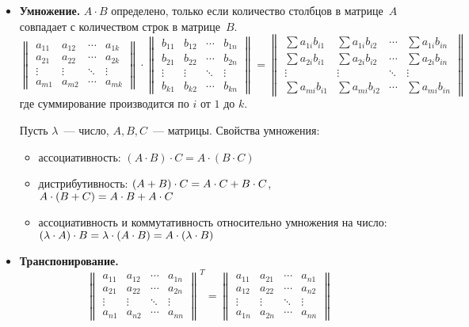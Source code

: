 \begin{itemize}
	\item\textbf{Умножение.} $A \cdot B$ определено, только если количество столбцов в матрице~$A$ совпадает с количеством строк в матрице~$B$.
	\begin{equation*}
	\begin{Vmatrix}
	a_{11} & a_{12} & \cdots & a_{1k} \\ 
	a_{21} & a_{22} & \cdots & a_{2k} \\ 
	\vdots & \vdots & \ddots & \vdots \\ 
	a_{m1} & a_{m2} & \cdots & a_{mk}
	\end{Vmatrix} \cdot
	\begin{Vmatrix}
	b_{11} & b_{12} & \cdots & b_{1n} \\ 
	b_{21} & b_{22} & \cdots & b_{2n} \\ 
	\vdots & \vdots & \ddots & \vdots \\ 
	b_{k1} & b_{k2} & \cdots & b_{kn}
	\end{Vmatrix} =
	\begin{Vmatrix}
	\sum a_{1i}b_{i1} & \sum a_{1i}b_{i2} & \cdots & \sum a_{1i}b_{in} \\
	\sum a_{2i}b_{i1} & \sum a_{2i}b_{i2} & \cdots & \sum a_{2i}b_{in} \\
	\vdots & \vdots & \ddots & \vdots \\
	\sum a_{mi}b_{i1} & \sum a_{mi}b_{i2} & \cdots & \sum a_{mi}b_{in}
	\end{Vmatrix}
	\end{equation*}
	где суммирование производится по $i$ от $1$ до $k$.
	
	Пусть $\lambda$~--- число, $A, B, C$~--- матрицы. Свойства умножения:
	\begin{itemize}
		\item ассоциативность:
		$(A \cdot B) \cdot C = A \cdot (B \cdot C)$
		\item дистрибутивность:
		$(A + B) \cdot C \opbr= A \cdot C + B \cdot C$,
		$A \cdot (B + C) \opbr= A \cdot B + A \cdot C$
		\item ассоциативность и коммутативность относительно умножения на число:
		$(\lambda \cdot A) \cdot B \opbr= \lambda \cdot (A \cdot B) \opbr= A \cdot (\lambda \cdot B)$
	\end{itemize}
	
	\item\textbf{Транспонирование.}
	\begin{equation*}
	\begin{Vmatrix}
	a_{11} & a_{12} & \cdots & a_{1n} \\
	a_{21} & a_{22} & \cdots & a_{2n} \\
	\vdots & \vdots & \ddots & \vdots \\
	a_{n1} & a_{n2} & \cdots & a_{nn}
	\end{Vmatrix}^T =
	\begin{Vmatrix}
	a_{11} & a_{21} & \cdots & a_{n1} \\
	a_{12} & a_{22} & \cdots & a_{n2} \\
	\vdots & \vdots & \ddots & \vdots \\
	a_{1n} & a_{2n} & \cdots & a_{nn}
	\end{Vmatrix}
	\end{equation*}
\end{itemize}